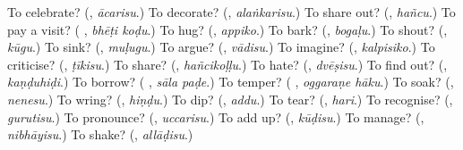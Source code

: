 \begin{tcolorbox}[breakable,colback=teal!4,colframe=teal!35!black,title={Before you move on}]
To celebrate? (\textbf{}, \emph{ācarisu}.) To decorate? (\textbf{}, \emph{alaṅkarisu}.) To share out? (\textbf{}, \emph{hañcu}.) To pay a visit? (\textbf{ }, \emph{bhēṭi koḍu}.) To hug? (\textbf{}, \emph{appiko}.) To bark? (\textbf{}, \emph{bogaḷu}.) To shout? (\textbf{}, \emph{kūgu}.) To sink? (\textbf{}, \emph{muḷugu}.) To argue? (\textbf{}, \emph{vādisu}.) To imagine? (\textbf{}, \emph{kalpisiko}.) To criticise? (\textbf{}, \emph{ṭīkisu}.) To share? (\textbf{}, \emph{hañcikoḷḷu}.) To hate? (\textbf{}, \emph{dvēṣisu}.) To find out? (\textbf{}, \emph{kaṇḍuhiḍi}.) To borrow? (\textbf{ }, \emph{sāla paḍe}.) To temper? (\textbf{ }, \emph{oggaraṇe hāku}.) To soak? (\textbf{}, \emph{nenesu}.) To wring? (\textbf{}, \emph{hiṇḍu}.) To dip? (\textbf{}, \emph{addu}.) To tear? (\textbf{}, \emph{hari}.) To recognise? (\textbf{}, \emph{gurutisu}.) To pronounce? (\textbf{}, \emph{uccarisu}.) To add up? (\textbf{}, \emph{kūḍisu}.) To manage? (\textbf{}, \emph{nibhāyisu}.) To shake? (\textbf{}, \emph{allāḍisu}.)
\end{tcolorbox}
